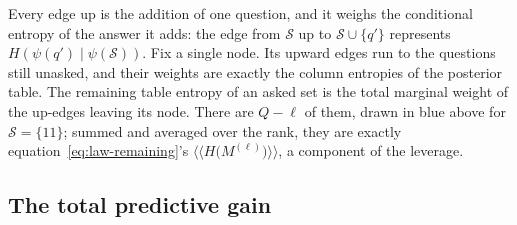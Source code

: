 \documentclass[11pt]{article}
\begin{document}
\begin{example}
\begin{center}
\end{center}

Every edge up is the addition of one question, and it weighs the
conditional entropy of the answer it adds: the edge from
$\mathcal S$ up to $\mathcal S \cup \{q'\}$ represents
$H(\psi(q') \mid \psi(\mathcal S))$. Fix a single node. Its upward edges run to the
questions still unasked, and their weights are exactly the column
entropies of the posterior table. The
remaining table entropy of an asked set is the total marginal weight of the
up-edges leaving its node. There are $Q - \ell$ of them, drawn in
blue above for $\mathcal S = \{11\}$; summed and averaged over the
rank, they are exactly equation~\eqref{eq:law-remaining}'s $\big\langle\!\big\langle H\big(M^{(\ell)}\big)\big\rangle\!\big\rangle$, a component of
the leverage.
\end{example}

\subsection{The total predictive gain}\label{sec:predgain}
\end{document}

